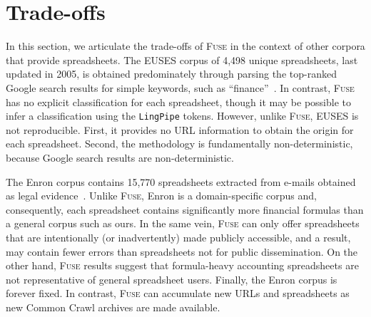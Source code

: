 \documentclass[conference]{IEEEtran}
\begin{document}




\section{Trade-offs}
\label{sec:trade-offs}

\balance

In this section, we articulate the trade-offs of \textsc{Fuse} in the context of other corpora that provide spreadsheets. The EUSES corpus of 4,498 unique spreadsheets, last updated in 2005, is obtained predominately through parsing the top-ranked Google search results for simple keywords, such as ``finance''~\cite{Fisher2005}. In contrast, \textsc{Fuse} has no explicit classification for each spreadsheet, though it may be possible to infer a classification using the \texttt{LingPipe} tokens. However, unlike \textsc{Fuse}, EUSES is not reproducible. First, it provides no URL information to obtain the origin for each spreadsheet. Second, the methodology is fundamentally non-deterministic, because Google search results are non-deterministic.

The Enron corpus contains 15,770 spreadsheets extracted from e-mails obtained as legal evidence~\cite{Hermans2015}. Unlike \textsc{Fuse}, Enron is a domain-specific corpus and, consequently, each spreadsheet contains significantly more financial formulas than a general corpus such as ours. In the same vein, \textsc{Fuse} can only offer spreadsheets that are intentionally (or inadvertently) made publicly accessible, and a result, may contain fewer errors than spreadsheets not for public dissemination. On the other hand, \textsc{Fuse} results suggest that formula-heavy accounting spreadsheets are not representative of general spreadsheet users. Finally, the Enron corpus is forever fixed. In contrast, \textsc{Fuse} can accumulate new URLs and spreadsheets as new Common Crawl archives are made available.
\end{document}
